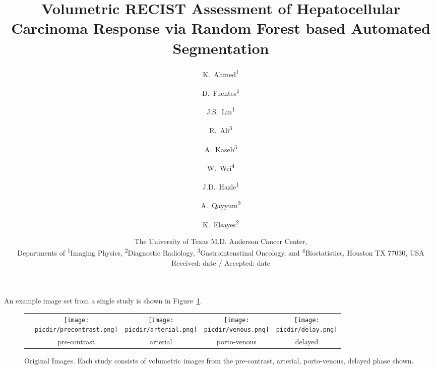 \documentclass[10pt]{amsart}
\title[Volumetric RECIST Assessment of HCC Response via RF-based Automated Segmentation]{Volumetric RECIST Assessment of Hepatocellular Carcinoma Response 
via Random Forest based Automated Segmentation 
}
\author{K.~Ahmed\textsuperscript{1} \and
        D.~Fuentes\textsuperscript{1} \and
        J.S.~Lin\textsuperscript{1} \and
        R.~Ali\textsuperscript{3} \and
        A.~Kaseb\textsuperscript{3} \and
        W.~Wei\textsuperscript{4} \and
        J.D.~Hazle\textsuperscript{1} \and
        A.~Qayyum\textsuperscript{2} \and
        K.~Elsayes\textsuperscript{2} 
}
\date{ \small
The University of Texas M.D. Anderson Cancer Center,\\
Departments of \textsuperscript{1}Imaging Physics, \textsuperscript{2}Diagnostic Radiology,
\textsuperscript{3}Gastrointenstinal Oncology,
and \textsuperscript{4}Biostatistics, Houston TX 77030, USA \\
Received: date / Accepted: date
}
\newif\iflatextortf
\newcommand{\picdir}{./pdffig}
\begin{document}
 An example image set from a single study is shown in Figure~\ref{Fig:OriginalImages}.

\begin{figure}[h] 
\iflatextortf 
\else
\begin{tabular}{ccccc} 
& \scalebox{0.45}{\texttt{[image: \\picdir/precontrast.png]}}
& \scalebox{0.45}{\texttt{[image: \\picdir/arterial.png]}   }
& \scalebox{0.45}{\texttt{[image: \\picdir/venous.png]}     }
& \scalebox{0.45}{\texttt{[image: \\picdir/delay.png]}      }
\\
& pre-contrast & arterial & porto-venous & delayed 
\\ 
\end{tabular}           
\fi
\caption{Original Images. Each study consists of volumetric images from the
pre-contrast, arterial, porto-venous, delayed phase shown. 
}\label{Fig:OriginalImages}
\end{figure}  
\end{document}
